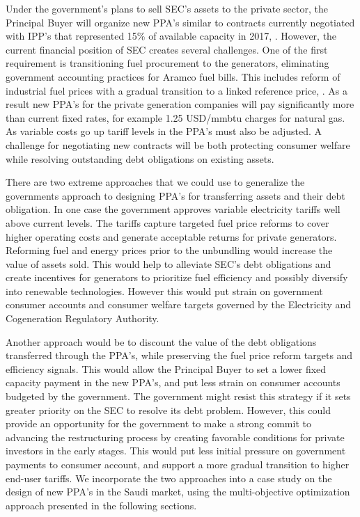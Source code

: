 \documentclass[informs]{informs3}
\begin{document}
Under the government’s plans to sell SEC’s assets to the private sector, the Principal Buyer will organize new PPA’s similar to contracts currently negotiated with IPP’s that represented 15\% of available capacity in 2017, \cite{ECRA_2018}. However, the current financial position of SEC creates several challenges. One of the first requirement is transitioning fuel procurement to the generators, eliminating government accounting practices for Aramco fuel bills. This includes reform of industrial fuel prices with a gradual transition to a linked reference price,  \cite{Fiscal_Balance_2018}. As a result new PPA’s for the private generation companies will pay significantly more than current fixed rates, for example 1.25 USD/mmbtu charges for natural gas. As variable costs go up tariff levels in the PPA’s must also be adjusted. A challenge for negotiating new contracts will be both protecting consumer welfare while resolving outstanding debt obligations on existing assets.


There are two extreme approaches that we could use to generalize the governments approach to designing PPA’s for transferring assets and their debt obligation. In one case the government approves variable electricity tariffs well above current levels. The tariffs capture targeted fuel price reforms to cover higher operating costs and generate acceptable returns for private generators. %
Reforming fuel and energy prices prior to the unbundling would increase the value of assets sold. This would help to alleviate SEC’s debt obligations and create incentives for generators to prioritize fuel efficiency and possibly diversify into renewable technologies. However this would put strain on government consumer accounts and consumer welfare targets governed by the Electricity and Cogeneration Regulatory Authority.  

Another approach would be to discount the value of the debt obligations transferred through the PPA’s, while preserving the fuel price reform targets and efficiency signals. This would allow the Principal Buyer to set a lower fixed capacity payment in the new PPA’s, and put less strain on consumer accounts budgeted by the government. The government might resist this strategy if it sets greater priority on the SEC to resolve its debt problem. However, this could provide an opportunity for the government to make a strong commit to advancing the restructuring process by creating favorable conditions for private investors in the early stages. This would put less initial pressure on government payments to consumer account, and support a more gradual transition to higher end-user tariffs. We incorporate the two approaches into a case study on the design of new PPA’s in the Saudi market, using the multi-objective optimization approach presented in the following sections.
\end{document}
